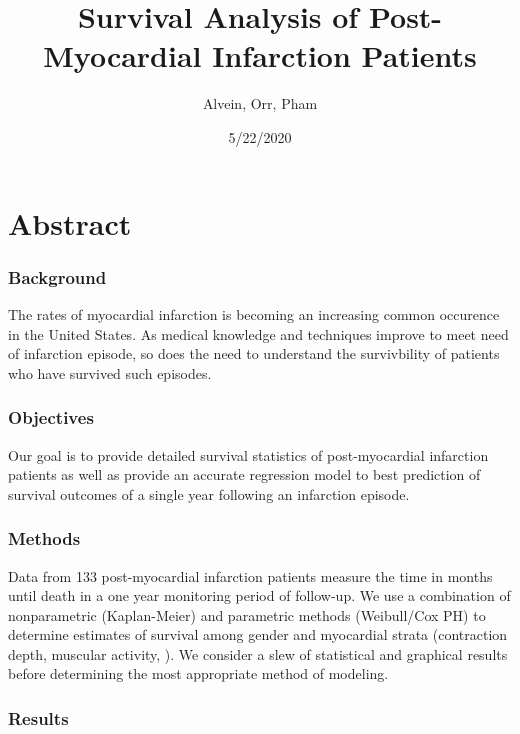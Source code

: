 \documentclass[
]{article}
\title{Survival Analysis of Post-Myocardial Infarction Patients}
\author{Alvein, Orr, Pham}
\date{5/22/2020}
\begin{document}
\maketitle

\hypertarget{abstract}{%
\section{Abstract}\label{abstract}}

\hypertarget{background}{%
\subsubsection{Background}\label{background}}

The rates of myocardial infarction is becoming an increasing common
occurence in the United States. As medical knowledge and techniques
improve to meet need of infarction episode, so does the need to
understand the survivbility of patients who have survived such episodes.

\hypertarget{objectives}{%
\subsubsection{Objectives}\label{objectives}}

Our goal is to provide detailed survival statistics of post-myocardial
infarction patients as well as provide an accurate regression model to
best prediction of survival outcomes of a single year following an
infarction episode.

\hypertarget{methods}{%
\subsubsection{Methods}\label{methods}}

Data from 133 post-myocardial infarction patients measure the time in
months until death in a one year monitoring period of follow-up. We use
a combination of nonparametric (Kaplan-Meier) and parametric methods
(Weibull/Cox PH) to determine estimates of survival among gender and
myocardial strata (contraction depth, muscular activity, ). We consider
a slew of statistical and graphical results before determining the most
appropriate method of modeling.

\hypertarget{results}{%
\subsubsection{Results}\label{results}}
\end{document}
